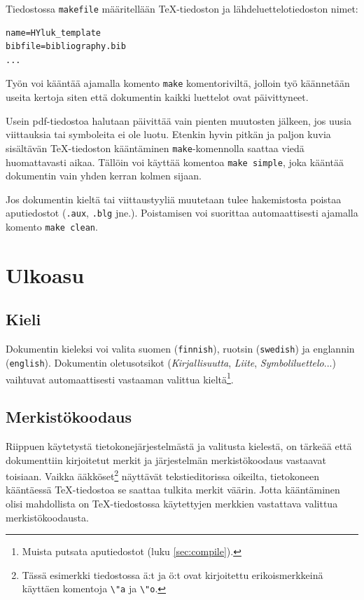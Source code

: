 \documentclass[finnish,twoside,openright,utf]{HYgradu}
\begin{document}
Tiedostossa \texttt{makefile} määritellään \TeX-tiedoston ja lähdeluettelotiedoston nimet:
\begin{verbatim}
name=HYluk_template
bibfile=bibliography.bib
...
\end{verbatim}
Työn voi kääntää ajamalla komento \texttt{make} komentoriviltä, jolloin työ käännetään useita kertoja siten että dokumentin kaikki luettelot ovat päivittyneet.

Usein pdf-tiedostoa halutaan päivittää vain pienten muutosten jälkeen, jos uusia viittauksia tai symboleita ei ole luotu. Etenkin hyvin pitkän ja paljon kuvia sisältävän \TeX-tiedoston kääntäminen \texttt{make}-komennolla saattaa viedä huomattavasti aikaa.
Tällöin voi käyttää komentoa \texttt{make simple}, joka kääntää dokumentin vain yhden kerran kolmen sijaan. 

Jos dokumentin kieltä tai viittaustyyliä muutetaan tulee hakemistosta poistaa aputiedostot (\texttt{.aux}, \texttt{.blg} jne.). Poistamisen voi suorittaa automaattisesti ajamalla komento \texttt{make clean}.

\chapter{Ulkoasu}

\section{Kieli}

Dokumentin kieleksi voi valita suomen (\texttt{finnish}), ruotsin (\texttt{swedish}) ja englannin (\texttt{english}). Dokumentin oletusotsikot (\emph{Kirjallisuutta}, \emph{Liite}, \emph{Symboliluettelo}...) vaihtuvat automaattisesti vastaaman valittua kieltä\footnote{Muista putsata aputiedostot (luku \ref{sec:compile}).}. 

\section{Merkistökoodaus}
 
Riippuen käytetystä tietokonejärjestelmästä ja valitusta kielestä, on tärkeää että dokumenttiin kirjoitetut merkit ja järjestelmän merkistökoodaus vastaavat toisiaan. Vaikka ääkköset\footnote{Tässä esimerkki tiedostossa ä:t ja ö:t ovat kirjoitettu erikoismerkkeinä käyttäen komentoja \texttt{\textbackslash"a} ja \texttt{\textbackslash"o}.} näyttävät tekstieditorissa oikeilta, tietokoneen kääntäessä \TeX-tiedostoa se saattaa tulkita merkit väärin. Jotta kääntäminen olisi mahdollista on \TeX-tiedostossa käytettyjen merkkien vastattava valittua merkistökoodausta. 
\end{document}
